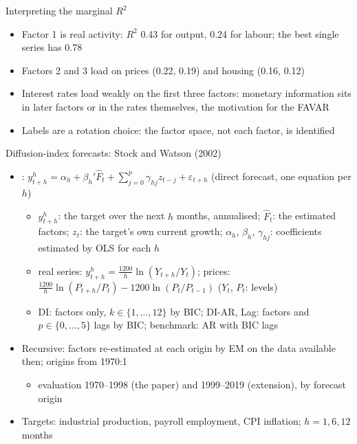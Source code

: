 \begin{frame}{Interpreting the marginal $R^2$}
\itemsize{\small}
\begin{itemize}
    \item Factor 1 is real activity: $R^2$ 0.43 for output, 0.24 for labour; the best single series has 0.78
    \item Factors 2 and 3 load on prices (0.22, 0.19) and housing (0.16, 0.12)
    \item Interest rates load weakly on the first three factors: monetary information sits in later factors or in the rates themselves, the motivation for the FAVAR
    \item Labels are a rotation choice: the factor space, not each factor, is identified
\end{itemize}
\end{frame}

\begin{frame}{Diffusion-index forecasts: Stock and Watson (2002)}
\itemsize{\small}
\begin{itemize}
    \item {}: $y_{t+h}^h = \alpha_h + \beta_h'\hat F_t + \sum_{j=0}^{p}\gamma_{hj}z_{t-j} + \varepsilon_{t+h}$ (direct forecast, one equation per $h$)
    \begin{itemize}
        \item $y_{t+h}^h$: the target over the next $h$ months, annualised; $\hat F_t$: the estimated factors; $z_t$: the target's own current growth; $\alpha_h$, $\beta_h$, $\gamma_{hj}$: coefficients estimated by OLS for each $h$
        \item real series: $y_{t+h}^h = \frac{1200}{h}\ln(Y_{t+h}/Y_t)$; prices: $\frac{1200}{h}\ln(P_{t+h}/P_t) - 1200\ln(P_t/P_{t-1})$ ($Y_t$, $P_t$: levels)
        \item DI: factors only, $k \in \{1, \dots, 12\}$ by BIC; DI-AR, Lag: factors and $p \in \{0, \dots, 5\}$ lags by BIC; benchmark: AR with BIC lags
    \end{itemize}
    \item Recursive: factors re-estimated at each origin by EM on the data available then; origins from 1970:1
    \begin{itemize}
        \item evaluation 1970--1998 (the paper) and 1999--2019 (extension), by forecast origin
    \end{itemize}
    \item Targets: industrial production, payroll employment, CPI inflation; $h = 1, 6, 12$ months
\end{itemize}
\end{frame}

